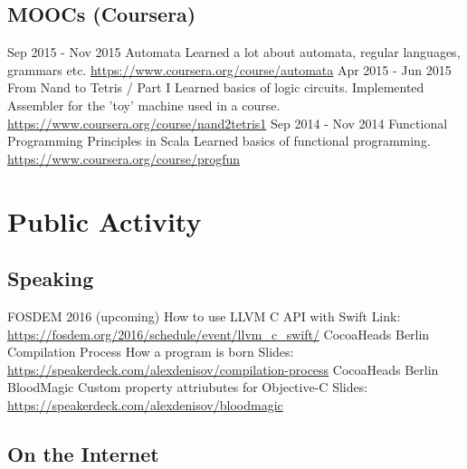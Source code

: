\documentclass[11pt,a4paper]{moderncv}
\begin{document}
  \subsection{MOOCs (Coursera)}
  \cventry
    {Sep 2015 - Nov 2015}
    {Automata}
    {\newline Learned a lot about automata, regular languages, grammars etc.}
    {}{\newline\url{https://www.coursera.org/course/automata}}{}
  \cventry
    {Apr 2015 - Jun 2015}
    {From Nand to Tetris / Part I}
    {\newline Learned basics of logic circuits. Implemented Assembler for the 'toy' machine used in a course.}
    {}{\newline\url{https://www.coursera.org/course/nand2tetris1}}{}
  \cventry
    {Sep 2014 - Nov 2014}
    {Functional Programming Principles in Scala}
    {\newline Learned basics of functional programming.}
    {}{\newline\url{https://www.coursera.org/course/progfun}}{}

\section{Public Activity}
  \subsection{Speaking}
  \cventry
    {FOSDEM 2016 (upcoming)}
    {How to use LLVM C API with Swift}
    {}
    {}{}
    {Link: \url{https://fosdem.org/2016/schedule/event/llvm_c_swift/}}
  \cventry
    {CocoaHeads Berlin}
    {Compilation Process}
    {How a program is born}
    {}{}
    {Slides: \url{https://speakerdeck.com/alexdenisov/compilation-process}}
  \cventry
    {CocoaHeads Berlin}
    {BloodMagic}
    {Custom property attriubutes for Objective-C}
    {}{}
    {Slides: \url{https://speakerdeck.com/alexdenisov/bloodmagic}}
  \subsection{On the Internet}
\end{document}

